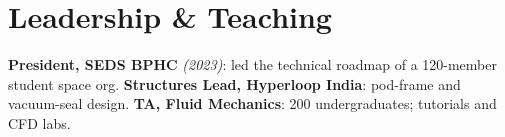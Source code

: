 \documentclass[letterpaper,10pt]{article}
\begin{document}
\section{Leadership \& Teaching}
\vspace{3pt}
\small
\textbf{\color{accent}President, SEDS BPHC} \textit{(2023)}: led the technical roadmap of a 120-member student space org. \enspace \textbf{\color{accent}Structures Lead, Hyperloop India}: pod-frame and vacuum-seal design. \enspace \textbf{\color{accent}TA, Fluid Mechanics}: 200 undergraduates; tutorials and CFD labs.
\end{document}
